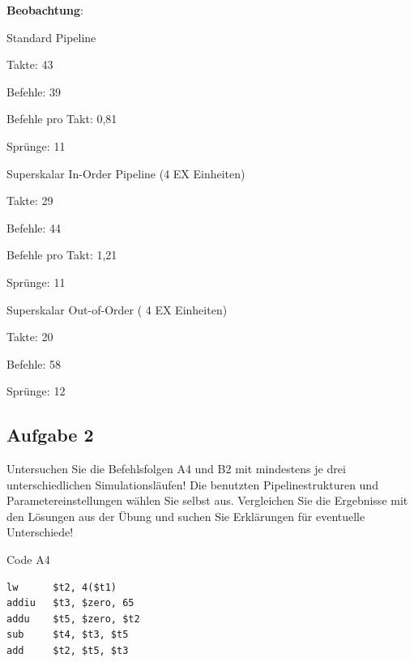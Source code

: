\documentclass[a4paper,12pt,titlepage]{scrartcl}
\begin{document}
\textbf{Beobachtung}:
\begin{itemize*}
    \item Standard Pipeline
    \begin{itemize*}
        \item Takte: 43
        \item Befehle: 39
        \item Befehle pro Takt: 0,81
        \item Sprünge: 11
    \end{itemize*}
    \item Superskalar In-Order Pipeline (4 EX Einheiten)
    \begin{itemize*}
        \item Takte: 29
        \item Befehle: 44
        \item Befehle pro Takt: 1,21
        \item Sprünge: 11
    \end{itemize*}
    \item Superskalar Out-of-Order ( 4 EX Einheiten)
    \begin{itemize*}
        \item Takte: 20
        \item Befehle: 58
        \item Sprünge: 12
    \end{itemize*}
\end{itemize*}

\subsection*{Aufgabe 2}
Untersuchen Sie die Befehlsfolgen A4 und B2 mit mindestens je drei unterschiedlichen Simulationsläufen! Die benutzten Pipelinestrukturen und Parametereinstellungen wählen Sie selbst aus. Vergleichen Sie die Ergebnisse mit den Lösungen aus der Übung und suchen Sie Erklärungen für eventuelle Unterschiede!

Code A4
\begin{lstlisting}[basicstyle=\tiny]
lw      $t2, 4($t1)
addiu   $t3, $zero, 65
addu    $t5, $zero, $t2
sub     $t4, $t3, $t5
add     $t2, $t5, $t3
\end{lstlisting}
\end{document}
